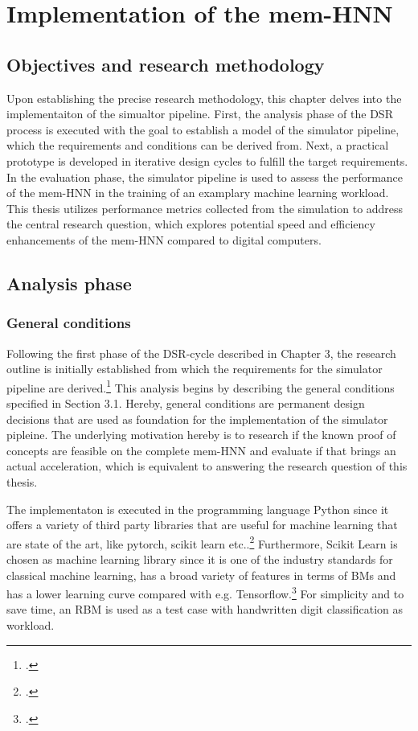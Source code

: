 \chapter{Implementation of the mem-HNN}

\section{Objectives and research methodology}
Upon establishing the precise research methodology, this chapter delves into the implementaiton of the simualtor pipeline.
First, the analysis phase of the \ac{DSR} process is executed with the goal to establish a model of the simulator pipeline,
which the requirements and conditions can be derived from. 
Next, a practical prototype is developed in iterative design cycles to fulfill the target requirements.
In the evaluation phase, the simulator pipeline is used to assess the performance of the \ac{mem-HNN} 
in the training of an examplary machine learning workload. 
This thesis utilizes performance metrics collected from the simulation to address the central research question, which explores potential speed and efficiency enhancements of the \ac{mem-HNN} compared to digital computers.


\section{Analysis phase}
\subsection{General conditions}

Following the first phase of the \ac{DSR}-cycle described in Chapter 3, the research outline is initially established from which the requirements for the simulator pipeline are derived.\footcite[cf.][278-279]{oesterleKonsortialforschung2010}
This analysis begins by describing the general conditions specified in Section 3.1.
Hereby, general conditions are permanent design decisions that are used as foundation for the implementation of the simulator pipleine.
The underlying motivation hereby is to research if the known proof of concepts are feasible on the complete \ac{mem-HNN}
and evaluate if that brings an actual acceleration, which is equivalent to answering the research question of this thesis. 

The implementaton is executed in the programming language Python since it offers a variety of third party libraries that are useful 
for machine learning that are state of the art, like pytorch, scikit learn etc..\footcite[cf.][306-307]{DiscreteContinuousModels}
Furthermore, Scikit Learn is chosen as machine learning library since it is one of the industry standards for classical machine learning, has a broad variety of features in terms of \ac{BM}s
and has a lower learning curve compared with e.g. Tensorflow.\footcite[cf.][5-6]{raschkaMachineLearningPython2020}
For simplicity and to save time, an \ac{RBM} is used as a test case with handwritten digit classification as workload.

